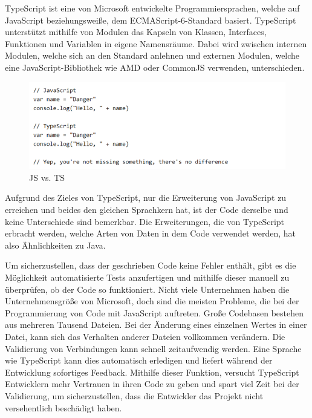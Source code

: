 TypeScript ist eine von Microsoft entwickelte Programmiersprachen, welche auf JavaScript beziehungsweiße, dem ECMAScript-6-Standard basiert. TypeScript unterstützt mithilfe von Modulen das Kapseln von Klassen, Interfaces, Funktionen und Variablen in eigene Namensräume. Dabei wird zwischen internen Modulen, welche sich an den Standard anlehnen und externen Modulen, welche eine JavaScript-Bibliothek wie AMD oder CommonJS verwenden, unterschieden. \cite{TypeScript}

\begin{figure}[H]
    \centering
    \includegraphics{media/TypeScript/JSvsTS.png}
    \caption{JS vs. TS}
\end{figure}





Aufgrund des Zieles von TypeScript, nur die Erweiterung von JavaScript zu erreichen und beides den gleichen Sprachkern hat, ist der Code derselbe und keine Unterschiede sind bemerkbar. Die Erweiterungen, die von TypeScript erbracht werden, welche Arten von Daten in dem Code verwendet werden, hat also Ähnlichkeiten zu Java. \cite{TypeScript}


Um sicherzustellen, dass der geschrieben Code keine Fehler enthält, gibt es die Möglichkeit automatisierte Tests anzufertigen und mithilfe dieser manuell zu überprüfen, ob der Code so funktioniert.
Nicht viele Unternehmen haben die Unternehmensgröße von Microsoft, doch sind die meisten Probleme, die bei der Programmierung von Code mit JavaScript auftreten. Große Codebasen bestehen aus mehreren Tausend Dateien. Bei der Änderung eines einzelnen Wertes in einer Datei, kann sich das Verhalten anderer Dateien vollkommen verändern.
Die Validierung von Verbindungen kann schnell zeitaufwendig werden. Eine Sprache wie TypeScript kann dies automatisch erledigen und liefert während der Entwicklung sofortiges Feedback. Mithilfe dieser Funktion, versucht TypeScript Entwicklern mehr Vertrauen in ihren Code zu geben und spart viel Zeit bei der Validierung, um sicherzustellen, dass die Entwickler das Projekt nicht versehentlich beschädigt haben. \cite{ScriptWiki}
